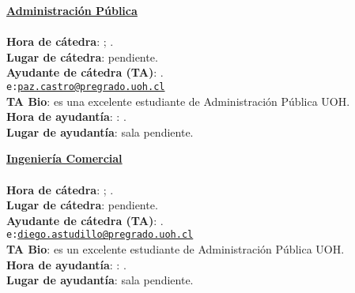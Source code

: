 \documentclass[letterpaper]{article}
\begin{document}
\vspace{5mm}
{\bf \underline{Administraci\'on P\'ublica}}
\\
\\
{\bf Hora de c\'atedra}: {\unskip}; {\unskip}.\\
{\bf Lugar de c\'atedra}: {\color{red}pendiente}.\\

\vspace{2mm}
{\bf Ayudante de c\'atedra (TA)}: {\unskip}.\\
\texttt{e:}\href{mailto:paz.castro@pregrado.uoh.cl}{\texttt{paz.castro@pregrado.uoh.cl}}\\
{\bf TA Bio}: {\unskip} es una excelente estudiante de Administraci\'on P\'ublica UOH.\\
{\bf Hora de ayudant\'ia}: {\unskip}: {\unskip}.\\
{\bf Lugar de ayudant\'ia}: {\color{red}sala pendiente}.



\vspace{5mm}
{\bf \underline{Ingenier\'ia Comercial}}
\\
\\
{\bf Hora de c\'atedra}: {\unskip}; {\unskip}.\\
{\bf Lugar de c\'atedra}: {\color{red}pendiente}.\\

\vspace{2mm}
{\bf Ayudante de c\'atedra (TA)}: {\unskip}.\\
\texttt{e:}\href{mailto:diego.astudillo@pregrado.uoh.cl}{\texttt{diego.astudillo@pregrado.uoh.cl}}\\
{\bf TA Bio}: {\unskip} es un excelente estudiante de Administraci\'on P\'ublica UOH.\\
{\bf Hora de ayudant\'ia}: {\unskip}: {\unskip}.\\
{\bf Lugar de ayudant\'ia}: {\color{red}sala pendiente}.
\end{document}
